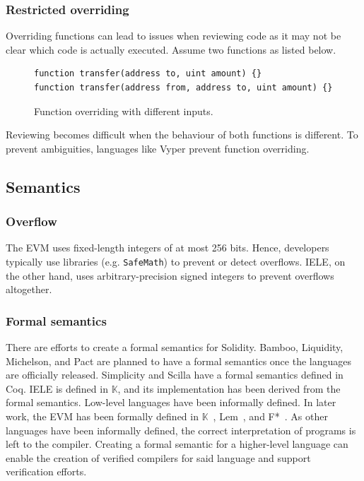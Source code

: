 \subsubsection{Restricted overriding}
Overriding functions can lead to issues when reviewing code as it may not be clear which code is actually executed. Assume two functions as listed below.

\begin{figure}[!h]
\begin{lstlisting}[language=Solidity]
function transfer(address to, uint amount) {}
function transfer(address from, address to, uint amount) {}
\end{lstlisting}
\caption{Function overriding with different inputs.}
\label{lst:overriding}
\end{figure}

Reviewing becomes difficult when the behaviour of both functions is different.
To prevent ambiguities, languages like Vyper prevent function overriding.


\subsection{Semantics}
\subsubsection{Overflow}
The EVM uses fixed-length integers of at most 256 bits.
Hence, developers typically use libraries (e.g. \texttt{SafeMath}) to prevent or detect overflows.
IELE, on the other hand, uses arbitrary-precision signed integers to prevent overflows altogether.

\subsubsection{Formal semantics}
There are efforts to create a formal semantics for Solidity.
Bamboo, Liquidity, Michelson, and Pact are planned to have a formal semantics once the languages are officially released.  
Simplicity and Scilla have a formal semantics defined in Coq. IELE is defined in $\mathbb{K}$, and its implementation has been derived from the formal semantics.
Low-level languages have been informally defined. In later work, the EVM has been formally defined in $\mathbb{K}$~\cite{Hildenbrandt2017}, Lem~\cite{Hirai2017}, and F*~\cite{Grishchenko2018}.
As other languages have been informally defined, the correct interpretation of programs is left to the compiler. Creating a formal semantic for a higher-level language can enable the creation of verified compilers for said language and support verification efforts.

